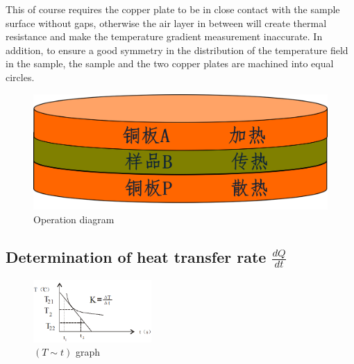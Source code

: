 \documentclass[UTF8]{article}
\begin{document}
    This of course requires the copper plate to be in close contact with the sample surface without gaps, otherwise the air layer in between will create thermal resistance and make the temperature gradient measurement inaccurate. In addition, to ensure a good symmetry in the distribution of the temperature field in the sample, the sample and the two copper plates are machined into equal circles.
    
    \begin{figure}[H]
    	\centering
    	\includegraphics[clip,scale=0.8]{fig/fig8.png}
    	\caption{Operation diagram}
    	\label{figure.7}
    \end{figure}
    
	\subsection{Determination of heat transfer rate $\frac{dQ}{dt} $}
	
	\begin{figure}%
		\centering
		\includegraphics[width=0.4\textwidth,trim={0 35 0 0}]{fig/fig9.png}
		\caption{\footnotesize $\left ( T\sim t \right ) $ graph}
	\end{figure}
\end{document}
